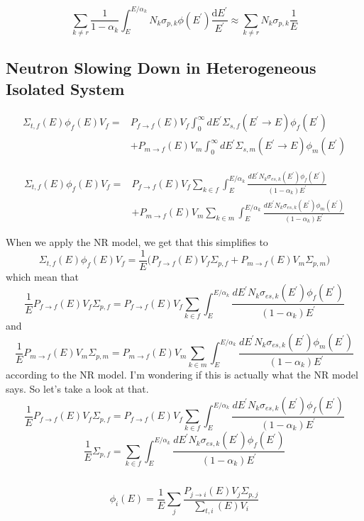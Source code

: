 \documentclass[10pt]{article}
\begin{document}
\[\sum_{k\neq r}\frac{1}{1-\alpha_{k}}\int_{E}^{E/\alpha_{k}}N_{k}\sigma_{p,k}\phi\left(E^{\prime}\right)\frac{\mathrm{d}E^{\prime}}{E^{\prime}}\approx\sum_{k\neq r}N_{k}\sigma_{p,k}\frac{1}{E}\]




\subsection*{Neutron Slowing Down in Heterogeneous Isolated System}
\[\begin{aligned}\Sigma_{t,f}(E)\phi_{f}(E)V_{f}=&P_{f\rightarrow f}(E)V_{f}\int_{0}^{\infty}dE^{\prime}\Sigma_{s,f}\left(E^{\prime}\rightarrow E\right)\phi_{f}\left(E^{\prime}\right)\\&+P_{m\rightarrow f}(E)V_{m}\int_{0}^{\infty}dE^{\prime}\Sigma_{s,m}\left(E^{\prime}\rightarrow E\right)\phi_{m}\left(E^{\prime}\right)\end{aligned}\]

\[\begin{aligned}\Sigma_{t,f}(E)\phi_{f}(E)V_{f}=&P_{f\rightarrow f}(E)V_{f}\sum_{k\in f}\int_{E}^{E/\alpha_{k}}\frac{dE^{\prime}N_{k}\sigma_{es,k}\left(E^{\prime}\right)\phi_{f}\left(E^{\prime}\right)}{\left(1-\alpha_{k}\right)E^{\prime}}\\&+P_{m\rightarrow f}(E)V_{m}\sum_{k\in m}\int_{E}^{E/\alpha_{k}}\frac{dE^{\prime}N_{k}\sigma_{es,k}\left(E^{\prime}\right)\phi_{m}\left(E^{\prime}\right)}{\left(1-\alpha_{k}\right)E^{\prime}}\end{aligned}\]

When we apply the NR model, we get that this simplifies to
\[\Sigma_{t,f}(E)\phi_{f}(E)V_{f}=\frac{1}{E}\Big(P_{f\rightarrow f}(E)V_{f}\Sigma_{p,f}+P_{m\rightarrow f}(E)V_{m}\Sigma_{p,m}\Big)\]
which mean that
\[\frac{1}{E}P_{f\rightarrow f}(E)V_{f}\Sigma_{p,f}=P_{f\rightarrow f}(E)V_{f}\sum_{k\in f}\int_{E}^{E/\alpha_{k}}\frac{dE^{\prime}N_{k}\sigma_{es,k}\left(E^{\prime}\right)\phi_{f}\left(E^{\prime}\right)}{\left(1-\alpha_{k}\right)E^{\prime}}\]
and
\[\frac{1}{E}P_{m\rightarrow f}(E)V_{m}\Sigma_{p,m}=P_{m\rightarrow f}(E)V_{m}\sum_{k\in m}\int_{E}^{E/\alpha_{k}}\frac{dE^{\prime}N_{k}\sigma_{es,k}\left(E^{\prime}\right)\phi_{m}\left(E^{\prime}\right)}{\left(1-\alpha_{k}\right)E^{\prime}}\]
according to the NR model. I'm wondering if this is actually what the NR model says. So let's take a look at that.
\[~\]
\[\frac{1}{E}P_{f\rightarrow f}(E)V_{f}\Sigma_{p,f}=P_{f\rightarrow f}(E)V_{f}\sum_{k\in f}\int_{E}^{E/\alpha_{k}}\frac{dE^{\prime}N_{k}\sigma_{es,k}\left(E^{\prime}\right)\phi_{f}\left(E^{\prime}\right)}{\left(1-\alpha_{k}\right)E^{\prime}}\]
\[\frac{1}{E}\Sigma_{p,f}=\sum_{k\in f}\int_{E}^{E/\alpha_{k}}\frac{dE^{\prime}N_{k}\sigma_{es,k}\left(E^{\prime}\right)\phi_{f}\left(E^{\prime}\right)}{\left(1-\alpha_{k}\right)E^{\prime}}\]




\[~\]
\[~\]
\[~\]

\[\phi_{i}(E)=\frac{1}{E}\sum_{j}\frac{P_{j\rightarrow i}(E)V_{j}\Sigma_{p,j}}{\sum_{t,i}(E)V_{i}}\]





\end{document}
